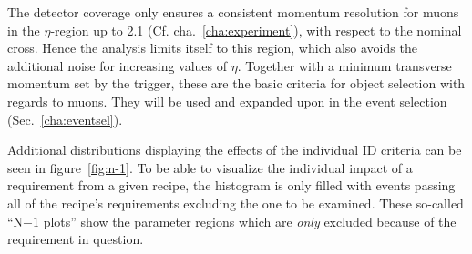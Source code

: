 The detector coverage only ensures a consistent momentum resolution for muons in the $\eta$-region up to 2.1 (Cf. cha.~\ref{cha:experiment}), with respect to the nominal cross. Hence the analysis limits itself to this region, which also avoids the additional noise for increasing values of $\eta$. Together with a minimum transverse momentum set by the trigger, these are the basic criteria for object selection with regards to muons. They will be used and expanded upon in the event selection (Sec.~\ref{cha:eventsel}).

Additional distributions displaying the effects of the individual ID criteria can be seen in figure~\ref{fig:n-1}. To be able to visualize the individual impact of a requirement from a given recipe, the histogram is only filled with events passing all of the recipe's requirements excluding the one to be examined. These so-called ``N$ - 1$ plots'' show the parameter regions which are \textit{only} excluded because of the requirement in question.

